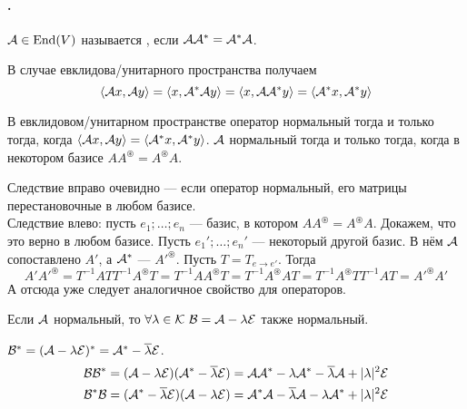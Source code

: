 \documentclass{article}
\newcommand{\id}{{\mathcal{E}}}
\begin{document}
    \paragraph{.}
    \begin{itemize}
        \dfn ${\mathcal{A}}\in\operatorname{End}(V)$ называется , если ${\mathcal{A}}{\mathcal{A}}^*={\mathcal{A}}^*{\mathcal{A}}$.
        \begin{Comment}
            В случае евклидова/унитарного пространства получаем
            \[
            {\left\langle{{\mathcal{A}}x},{{\mathcal{A}} y}\right\rangle}={\left\langle{x},{{\mathcal{A}}^*{\mathcal{A}} y}\right\rangle}={\left\langle{x},{{\mathcal{A}}{\mathcal{A}}^*y}\right\rangle}={\left\langle{{\mathcal{A}}^*x},{{\mathcal{A}}^*y}\right\rangle}
            \]
        \end{Comment}
        \thm В евклидовом/унитарном пространстве оператор нормальный тогда и только тогда, когда ${\left\langle{{\mathcal{A}}x},{{\mathcal{A}} y}\right\rangle}={\left\langle{{\mathcal{A}}^*x},{{\mathcal{A}}^*y}\right\rangle}$.
        \thm ${\mathcal{A}}$ нормальный тогда и только тогда, когда в некотором базисе $AA^\circledast=A^\circledast A$.
        \begin{Proof}
            Следствие вправо очевидно --- если оператор нормальный, его матрицы перестановочные в любом базисе.\\
            Следствие влево: пусть $e_1;\ldots;e_n$ --- базис, в котором $AA^\circledast=A^\circledast A$. Докажем, что это верно в любом базисе. Пусть $e_1';\ldots;e_n'$ --- некоторый другой базис. В нём ${\mathcal{A}}$ сопоставлено $A'$, а ${\mathcal{A}}^*$ --- ${A'}^\circledast$. Пусть $T=T_{e\to e'}$. Тогда
            $$
            A'{A'}^\circledast=T^{-1}ATT^{-1}A^\circledast T=T^{-1}AA^\circledast T=T^{-1}A^\circledast AT=T^{-1}A^\circledast TT^{-1}AT={A'}^\circledast A'
            $$
            А отсюда уже следует аналогичное свойство для операторов.
        \end{Proof}
        \thm Если ${\mathcal{A}}$ нормальный, то $\forall\lambda\in\scriptK~\scriptB=\scriptA-\lambda\id$ также нормальный.
        \begin{Proof}
            $\scriptB^*=(\scriptA-\lambda\id)^*=\scriptA^*-\overline\lambda\id$.\\
            \[\begin{split}
                \scriptB\scriptB^*&=(\scriptA-\lambda\id)(\scriptA^*-\overline\lambda\id)=\scriptA\scriptA^*-\lambda\scriptA^*-\overline\lambda\scriptA+|\lambda|^2\id\\
                \scriptB^*\scriptB&=(\scriptA^*-\overline\lambda\id)(\scriptA-\lambda\id)=\scriptA^*\scriptA-\overline\lambda\scriptA-\lambda\scriptA^*+|\lambda|^2\id

\end{split}\]
\end{Proof}
\end{itemize}
\end{document}
